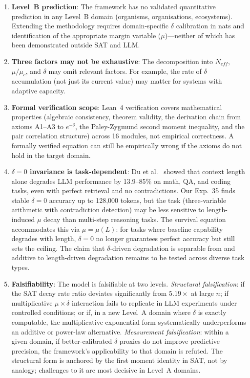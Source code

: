 \documentclass[11pt,a4paper]{article}
\begin{document}
\begin{enumerate}
    \item \textbf{Level~B prediction}: The framework has no validated quantitative prediction in any Level~B domain (organisms, organisations, ecosystems). Extending the methodology requires domain-specific $\delta$ calibration in nats and identification of the appropriate margin variable ($\mu$)---neither of which has been demonstrated outside SAT and LLM.

    \item \textbf{Three factors may not be exhaustive}: The decomposition into $N_{eff}$, $\mu/\mu_c$, and $\delta$ may omit relevant factors. For example, the rate of $\delta$ accumulation (not just its current value) may matter for systems with adaptive capacity.

    \item \textbf{Formal verification scope}: Lean~4 verification covers mathematical properties (algebraic consistency, theorem validity, the derivation chain from axioms A1--A3 to $e^{-\delta}$, the Paley-Zygmund second moment inequality, and the pair correlation structure) across 16 modules, not empirical correctness. A formally verified equation can still be empirically wrong if the axioms do not hold in the target domain.

    \item \textbf{$\delta = 0$ invariance is task-dependent}: Du et al.\ \citep{du2025contextlength} showed that context length alone degrades LLM performance by 13.9--85\% on math, QA, and coding tasks, even with perfect retrieval and no contradictions. Our Exp.~35 finds stable $\delta = 0$ accuracy up to 128{,}000 tokens, but the task (three-variable arithmetic with contradiction detection) may be less sensitive to length-induced $\mu$ decay than multi-step reasoning tasks. The survival equation accommodates this via $\mu = \mu(L)$: for tasks where baseline capability degrades with length, $\delta = 0$ no longer guarantees perfect accuracy but still sets the ceiling. The claim that $\delta$-driven degradation is separable from and additive to length-driven degradation remains to be tested across diverse task types.

    \item \textbf{Falsifiability}: The model is falsifiable at two levels. \emph{Structural falsification}: if the SAT decay rate ratio deviates significantly from $5.19\times$ at large $n$; if multiplicative $\mu \times \delta$ interaction fails to replicate in LLM experiments under controlled conditions; or if, in a new Level~A domain where $\delta$ is exactly computable, the multiplicative exponential form systematically underperforms an additive or power-law alternative. \emph{Measurement falsification}: within a given domain, if better-calibrated $\delta$ proxies do not improve predictive precision, the framework's applicability to that domain is refuted. The structural form is anchored by the first moment identity in SAT, not by analogy; challenges to it are most decisive in Level~A domains.
\end{enumerate}
\end{document}
